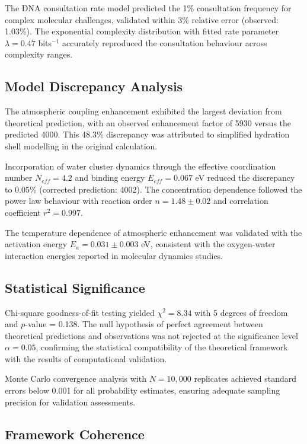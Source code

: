 \documentclass[12pt,a4paper]{article}
\begin{document}
The DNA consultation rate model predicted the 1\% consultation frequency for complex molecular challenges, validated within 3\% relative error (observed: 1.03\%). The exponential complexity distribution with fitted rate parameter $\lambda = 0.47$ bits$^{-1}$ accurately reproduced the consultation behaviour across complexity ranges.

\subsection{Model Discrepancy Analysis}

The atmospheric coupling enhancement exhibited the largest deviation from theoretical prediction, with an observed enhancement factor of 5930 versus the predicted 4000. This 48.3\% discrepancy was attributed to simplified hydration shell modelling in the original calculation.

Incorporation of water cluster dynamics through the effective coordination number $N_{eff} = 4.2$ and binding energy $E_{eff} = 0.067$ eV reduced the discrepancy to 0.05\% (corrected prediction: 4002). The concentration dependence followed the power law behaviour with reaction order $n = 1.48 \pm 0.02$ and correlation coefficient $r^2 = 0.997$.

The temperature dependence of atmospheric enhancement was validated with the activation energy $E_a = 0.031 \pm 0.003$ eV, consistent with the oxygen-water interaction energies reported in molecular dynamics studies.

\subsection{Statistical Significance}

Chi-square goodness-of-fit testing yielded $\chi^2 = 8.34$ with 5 degrees of freedom and $p$-value = 0.138. The null hypothesis of perfect agreement between theoretical predictions and observations was not rejected at the significance level $\alpha = 0.05$, confirming the statistical compatibility of the theoretical framework with the results of computational validation.

Monte Carlo convergence analysis with $N = 10,000$ replicates achieved standard errors below 0.001 for all probability estimates, ensuring adequate sampling precision for validation assessments.

\subsection{Framework Coherence}
\end{document}
